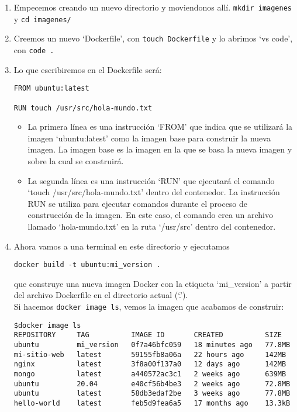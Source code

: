 \documentclass{article}
\begin{document}
\begin{enumerate}
      \item Empecemos creando un nuevo directorio y moviendonos allí. \lstinline{mkdir imagenes} y \lstinline{cd imagenes/}
      \item Creemos un nuevo \enquote*{Dockerfile}, con \lstinline{touch Dockerfile} y lo abrimos \enquote*{vs code}, con \lstinline{code .}
      \item Lo que escribiremos en el Dockerfile será:
      \begin{lstlisting}[numbers=none]
FROM ubuntu:latest

RUN touch /usr/src/hola-mundo.txt \end{lstlisting}
      \begin{itemize}
            \item La primera línea es una instrucción \enquote*{FROM} que indica que se utilizará la imagen \enquote*{ubuntu:latest} como la imagen base para construir la nueva imagen. La imagen base es la imagen en la que se basa la nueva imagen y sobre la cual se construirá.
            \item La segunda línea es una instrucción \enquote*{RUN} que ejecutará el comando \enquote*{touch /usr/src/hola-mundo.txt} dentro del contenedor. La instrucción RUN se utiliza para ejecutar comandos durante el proceso de construcción de la imagen. En este caso, el comando crea un archivo llamado \enquote*{hola-mundo.txt} en la ruta \enquote*{/usr/src} dentro del contenedor.
      \end{itemize}
      \item Ahora vamos a una terminal en este directorio y ejecutamos 
      \begin{lstlisting}[numbers=none]
docker build -t ubuntu:mi_version . \end{lstlisting} 
      que construye una nueva imagen Docker con la etiqueta \enquote*{mi\_version} a partir del archivo Dockerfile en el directorio actual (\enquote*{.}).\\
      Si hacemos \lstinline{docker image ls}, vemos la imagen que acabamos de construir:
      \begin{lstlisting}[numbers=none]
$docker image ls
REPOSITORY     TAG          IMAGE ID       CREATED          SIZE
ubuntu         mi_version   0f7a46bfc059   18 minutes ago   77.8MB
mi-sitio-web   latest       59155fb8a06a   22 hours ago     142MB
nginx          latest       3f8a00f137a0   12 days ago      142MB
mongo          latest       a440572ac3c1   2 weeks ago      639MB
ubuntu         20.04        e40cf56b4be3   2 weeks ago      72.8MB
ubuntu         latest       58db3edaf2be   3 weeks ago      77.8MB
hello-world    latest       feb5d9fea6a5   17 months ago    13.3kB \end{lstlisting}

\end{enumerate}
\end{document}
